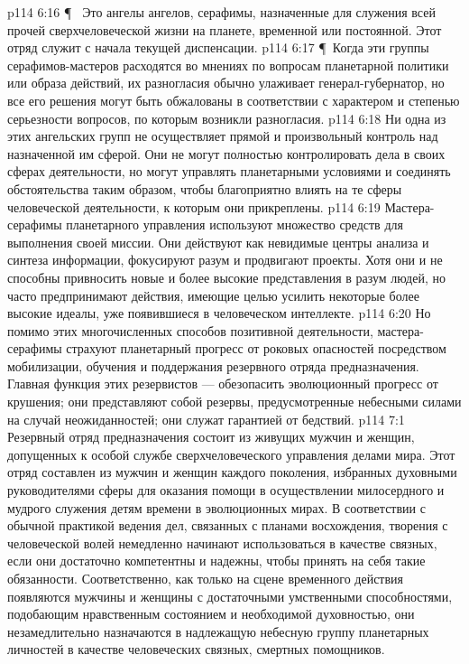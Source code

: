 \vs p114 6:16 \P\ \bibnobreakspace {} Это ангелы ангелов, серафимы, назначенные для служения всей прочей сверхчеловеческой жизни на планете, временной или постоянной. Этот отряд служит с начала текущей диспенсации.
\vs p114 6:17 \P\ Когда эти группы серафимов\hyp{}мастеров расходятся во мнениях по вопросам планетарной политики или образа действий, их разногласия обычно улаживает генерал\hyp{}губернатор, но все его решения могут быть обжалованы в соответствии с характером и степенью серьезности вопросов, по которым возникли разногласия.
\vs p114 6:18 Ни одна из этих ангельских групп не осуществляет прямой и произвольный контроль над назначенной им сферой. Они не могут полностью контролировать дела в своих сферах деятельности, но могут управлять планетарными условиями и соединять обстоятельства таким образом, чтобы благоприятно влиять на те сферы человеческой деятельности, к которым они прикреплены.
\vs p114 6:19 Мастера\hyp{}серафимы планетарного управления используют множество средств для выполнения своей миссии. Они действуют как невидимые центры анализа и синтеза информации, фокусируют разум и продвигают проекты. Хотя они и не способны привносить новые и более высокие представления в разум людей, но часто предпринимают действия, имеющие целью усилить некоторые более высокие идеалы, уже появившиеся в человеческом интеллекте.
\vs p114 6:20 Но помимо этих многочисленных способов позитивной деятельности, мастера\hyp{}серафимы страхуют планетарный прогресс от роковых опасностей посредством мобилизации, обучения и поддержания резервного отряда предназначения. Главная функция этих резервистов --- обезопасить эволюционный прогресс от крушения; они представляют собой резервы, предусмотренные небесными силами на случай неожиданностей; они служат гарантией от бедствий.
\vs p114 7:1 Резервный отряд предназначения состоит из живущих мужчин и женщин, допущенных к особой службе сверхчеловеческого управления делами мира. Этот отряд составлен из мужчин и женщин каждого поколения, избранных духовными руководителями сферы для оказания помощи в осуществлении милосердного и мудрого служения детям времени в эволюционных мирах. В соответствии с обычной практикой ведения дел, связанных с планами восхождения, творения с человеческой волей немедленно начинают использоваться в качестве связных, если они достаточно компетентны и надежны, чтобы принять на себя такие обязанности. Соответственно, как только на сцене временного действия появляются мужчины и женщины с достаточными умственными способностями, подобающим нравственным состоянием и необходимой духовностью, они незамедлительно назначаются в надлежащую небесную группу планетарных личностей в качестве человеческих связных, смертных помощников.
